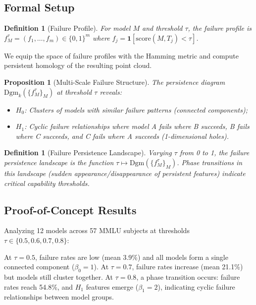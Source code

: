 \documentclass[11pt]{article}
\newtheorem{definition}[theorem]{Definition}
\newtheorem{proposition}[theorem]{Proposition}
\newcommand{\dgm}{\mathrm{Dgm}}
\begin{document}
\subsection{Formal Setup}

\begin{definition}[Failure Profile]
For model $M$ and threshold $\tau$, the \emph{failure profile} is $f_M^\tau = (f_1, \ldots, f_m) \in \{0,1\}^m$ where $f_j = \mathbf{1}[\text{score}(M, T_j) < \tau]$.
\end{definition}

We equip the space of failure profiles with the Hamming metric and compute persistent homology of the resulting point cloud.

\begin{proposition}[Multi-Scale Failure Structure]
The persistence diagram $\dgm_k(\{f_M^\tau\}_{M})$ at threshold $\tau$ reveals:
\begin{itemize}
\item $H_0$: Clusters of models with similar failure patterns (connected components);
\item $H_1$: Cyclic failure relationships where model A fails where B succeeds, B fails where C succeeds, and C fails where A succeeds (1-dimensional holes).
\end{itemize}
\end{proposition}

\begin{definition}[Failure Persistence Landscape]
Varying $\tau$ from 0 to 1, the \emph{failure persistence landscape} is the function $\tau \mapsto \dgm(\{f_M^\tau\}_M)$. Phase transitions in this landscape (sudden appearance/disappearance of persistent features) indicate critical capability thresholds.
\end{definition}

\subsection{Proof-of-Concept Results}

Analyzing 12 models across 57 MMLU subjects at thresholds $\tau \in \{0.5, 0.6, 0.7, 0.8\}$:

At $\tau = 0.5$, failure rates are low (mean 3.9\%) and all models form a single connected component ($\beta_0 = 1$). At $\tau = 0.7$, failure rates increase (mean 21.1\%) but models still cluster together. At $\tau = 0.8$, a phase transition occurs: failure rates reach 54.8\%, and $H_1$ features emerge ($\beta_1 = 2$), indicating cyclic failure relationships between model groups.
\end{document}
